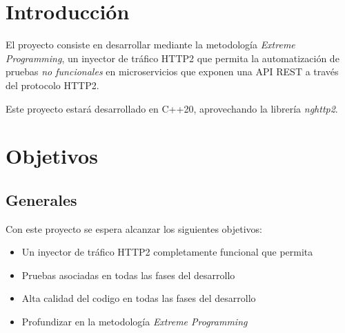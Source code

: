 \newpage
\section{Introducción}
El proyecto consiste en desarrollar mediante la metodología \emph{Extreme Programming}\cite{xp}, un inyector de tráfico HTTP2\cite{http2} que permita la automatización de pruebas \emph{no funcionales} en microservicios que exponen una API REST a través del protocolo HTTP2.

Este proyecto estará desarrollado en C++20\cite{cpp}, aprovechando la librería \emph{nghttp2}\cite{nghttp2}.

\section{Objetivos}
\subsection{Generales}
Con este proyecto se espera alcanzar los siguientes objetivos:
\begin{itemize}
    \item Un inyector de tráfico HTTP2 completamente funcional que permita
    \item Pruebas asociadas en todas las fases del desarrollo
    \item Alta calidad del codigo en todas las fases del desarrollo
    \item Profundizar en la metodología \emph{Extreme Programming}
\end{itemize}


